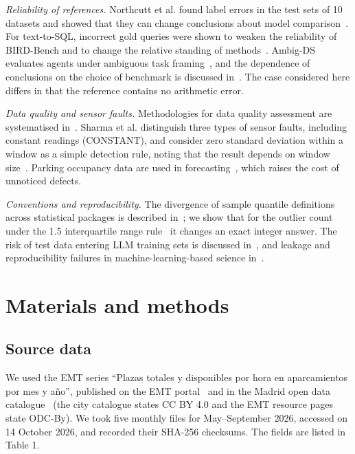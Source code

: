 \documentclass[default]{subfiles}
\begin{document}
{\emph{Reliability of references.} Northcutt et al. found label errors in the test sets of 10 datasets and showed that they can change conclusions about model comparison~\cite{northcutt2021}. For text-to-SQL, incorrect gold queries were shown to weaken the reliability of BIRD-Bench and to change the relative standing of methods~\cite{wretblad2024}. Ambig-DS evaluates agents under ambiguous task framing~\cite{stoisser2026}, and the dependence of conclusions on the choice of benchmark is discussed in~\cite{dehghani2021}. The case considered here differs in that the reference contains no arithmetic error.

\emph{Data quality and sensor faults.} Methodologies for data quality assessment are systematised in~\cite{batini2009}. Sharma et al. distinguish three types of sensor faults, including constant readings (CONSTANT), and consider zero standard deviation within a window as a simple detection rule, noting that the result depends on window size~\cite{sharma2010}. Parking occupancy data are used in forecasting~\cite{stolfi2020}, which raises the cost of unnoticed defects.

\emph{Conventions and reproducibility.} The divergence of sample quantile definitions across statistical packages is described in~\cite{hyndman1996}; we show that for the outlier count under the 1.5 interquartile range rule~\cite{tukey1977} it changes an exact integer answer. The risk of test data entering LLM training sets is discussed in~\cite{sainz2023}, and leakage and reproducibility failures in machine-learning-based science in~\cite{kapoor2023}.

\section{Materials and methods}

\subsection{Source data}

We used the EMT series ``Plazas totales y disponibles por hora en aparcamientos por mes y año'', published on the EMT portal~\cite{emt} and in the Madrid open data catalogue~\cite{madrid} (the city catalogue states CC BY 4.0 and the EMT resource pages state ODC-By). We took five monthly files for May--September 2026, accessed on 14 October 2026, and recorded their SHA-256 checksums. The fields are listed in Table 1.

}
\end{document}
